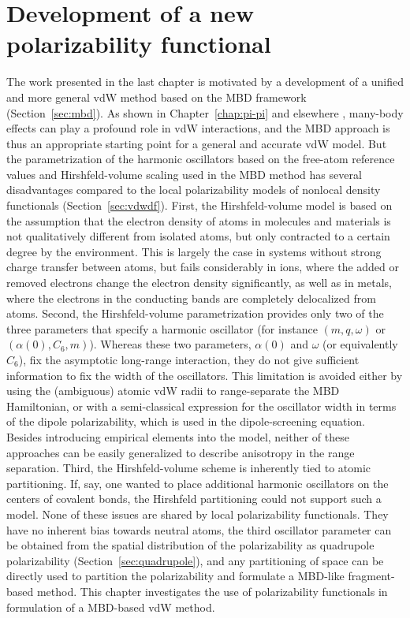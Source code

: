 \chapter{Development of a new polarizability functional}\label{chap:polarizability}

The work presented in the last chapter is motivated by a development of a unified and more general vdW method based on the MBD framework (Section~\ref{sec:mbd}).
As shown in Chapter~\ref{chap:pi-pi} and elsewhere \citep{HermannCR17}, many-body effects can play a profound role in vdW interactions, and the MBD approach is thus an appropriate starting point for a general and accurate vdW model.
But the parametrization of the harmonic oscillators based on the free-atom reference values and Hirshfeld-volume scaling used in the MBD method has several disadvantages compared to the local polarizability models of nonlocal density functionals (Section~\ref{sec:vdwdf}).
First, the Hirshfeld-volume model is based on the assumption that the electron density of atoms in molecules and materials is not qualitatively different from isolated atoms, but only contracted to a certain degree by the environment.
This is largely the case in systems without strong charge transfer between atoms, but fails considerably in ions, where the added or removed electrons change the electron density significantly, as well as in metals, where the electrons in the conducting bands are completely delocalized from atoms.
Second, the Hirshfeld-volume parametrization provides only two of the three parameters that specify a harmonic oscillator (for instance $(m,q,\omega)$ or $(\alpha(0),C_6,m)$).
Whereas these two parameters, $\alpha(0)$ and $\omega$ (or equivalently $C_6$), fix the asymptotic long-range interaction, they do not give sufficient information to fix the width of the oscillators.
This limitation is avoided either by using the (ambiguous) atomic vdW radii to range-separate the MBD Hamiltonian, or with a semi-classical expression for the oscillator width in terms of the dipole polarizability, which is used in the dipole-screening equation.
Besides introducing empirical elements into the model, neither of these approaches can be easily generalized to describe anisotropy in the range separation.
Third, the Hirshfeld-volume scheme is inherently tied to atomic partitioning.
If, say, one wanted to place additional harmonic oscillators on the centers of covalent bonds, the Hirshfeld partitioning could not support such a model.
None of these issues are shared by local polarizability functionals.
They have no inherent bias towards neutral atoms, the third oscillator parameter can be obtained from the spatial distribution of the polarizability as quadrupole polarizability (Section~\ref{sec:quadrupole}), and any partitioning of space can be directly used to partition the polarizability and formulate a MBD-like fragment-based method.
This chapter investigates the use of polarizability functionals in formulation of a MBD-based vdW method.

